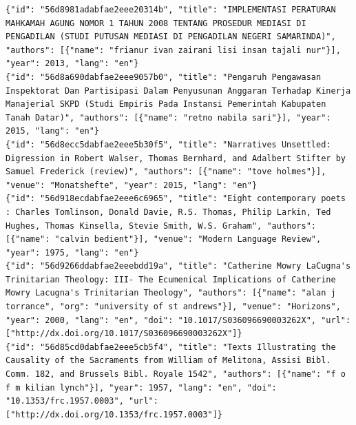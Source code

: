 \documentclass[twocolumn]{article}
\begin{document}
\begin{verbatim}  
{"id": "56d8981adabfae2eee20314b", "title": "IMPLEMENTASI PERATURAN MAHKAMAH AGUNG NOMOR 1 TAHUN 2008 TENTANG PROSEDUR MEDIASI DI PENGADILAN (STUDI PUTUSAN MEDIASI DI PENGADILAN NEGERI SAMARINDA)", "authors": [{"name": "frianur ivan zairani lisi insan tajali nur"}], "year": 2013, "lang": "en"}
{"id": "56d8a690dabfae2eee9057b0", "title": "Pengaruh Pengawasan Inspektorat Dan Partisipasi Dalam Penyusunan Anggaran Terhadap Kinerja Manajerial SKPD (Studi Empiris Pada Instansi Pemerintah Kabupaten Tanah Datar)", "authors": [{"name": "retno nabila sari"}], "year": 2015, "lang": "en"}
{"id": "56d8ecc5dabfae2eee5b30f5", "title": "Narratives Unsettled: Digression in Robert Walser, Thomas Bernhard, and Adalbert Stifter by Samuel Frederick (review)", "authors": [{"name": "tove holmes"}], "venue": "Monatshefte", "year": 2015, "lang": "en"}
{"id": "56d918ecdabfae2eee6c6965", "title": "Eight contemporary poets : Charles Tomlinson, Donald Davie, R.S. Thomas, Philip Larkin, Ted Hughes, Thomas Kinsella, Stevie Smith, W.S. Graham", "authors": [{"name": "calvin bedient"}], "venue": "Modern Language Review", "year": 1975, "lang": "en"}
{"id": "56d9266ddabfae2eeebdd19a", "title": "Catherine Mowry LaCugna's Trinitarian Theology: III- The Ecumenical Implications of Catherine Mowry Lacugna's Trinitarian Theology", "authors": [{"name": "alan j torrance", "org": "university of st andrews"}], "venue": "Horizons", "year": 2000, "lang": "en", "doi": "10.1017/S036096690003262X", "url": ["http://dx.doi.org/10.1017/S036096690003262X"]}
{"id": "56d85cd0dabfae2eee5cb5f4", "title": "Texts Illustrating the Causality of the Sacraments from William of Melitona, Assisi Bibl. Comm. 182, and Brussels Bibl. Royale 1542", "authors": [{"name": "f o f m kilian lynch"}], "year": 1957, "lang": "en", "doi": "10.1353/frc.1957.0003", "url": ["http://dx.doi.org/10.1353/frc.1957.0003"]}
\end{verbatim}



\end{document}
